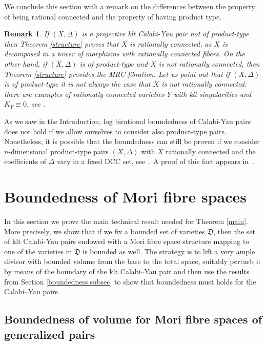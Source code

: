 \documentclass{amsart}[12pt,a4paper]
\newtheorem{remark}[theorem]{Remark}
\theoremstyle{definition}
\newcommand{\D}{\mathfrak{D}}
\begin{document}
We conclude this section with a remark on the differences between the property of being rational connected and the property of having product type.
\begin{remark}\label{rat.connected}
If $(X,\Delta)$ is a projective klt Calabi-Yau pair not of product-type then Theorem \ref{structure} proves that $X$ is rationally connected, as $X$ is decomposed in a tower of morphisms with rationally connected fibers.
On the other hand, if $(X,\Delta)$ is of product-type and $X$ is not rationally connected, then Theorem \ref{structure} provides the MRC fibration.
Let us point out that if $(X,\Delta)$ is of product-type it is not always the case that $X$ is not rationally connected: there are examples of rationally connected varieties $Y$ with klt singularities and $K_Y\equiv 0$, see \cite{MR3329200}.
\end{remark}

As we saw in the Introduction, log birational boundedness of Calabi-Yau pairs does not hold if we allow ourselves to consider also product-type pairs.
Nonetheless, it is possible that the boundedness can still be proven if we consider $n$-dimensional product-type pairs $(X, \Delta)$ with $X$ rationally connected and the coefficients of $\Delta$ vary in a fixed DCC set, see~\cite[Conjecture~1.3]{rccy3}.
A proof of this fact appears in~\cite[Theorem~1.4]{bds}.



\section{Boundedness of Mori fibre spaces}
\label{boundedness.sect}

In this section we prove the main technical result needed for Theorem \ref{main}. 
More precisely, we show that if we fix a bounded set of varieties $\D$, then the set of klt Calabi-Yau pairs endowed with a Mori fibre space structure mapping to one of the varieties in $\D$ is bounded as well. 
The strategy is to lift a very ample divisor with bounded volume from the base to the total space, suitably perturb it by means of the boundary of the klt Calabi--Yau pair and then use the results from Section \ref{boundedness.subsec} to show that boundedness must holds for the Calabi--Yau pairs.


\subsection{Boundedness of volume for Mori fibre spaces of generalized pairs}
\end{document}
